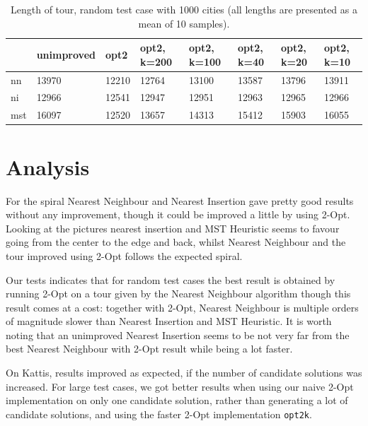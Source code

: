 \documentclass{report}
\begin{document}
\begin{table}
  \centering
  \begin{tabular}{|l|l|l|l|l|l|l|l|}
    \hline
   & unimproved      & opt2         & opt2, k=200  & opt2, k=100  & opt2, k=40   & opt2, k=20   & opt2, k=10  \\ \hline
nn & 13970 & 12210 & 12764 & 13100 & 13587 & 13796 & 13911 \\ \hline
ni & 12966 & 12541 & 12947 & 12951 & 12963 & 12965 & 12966 \\ \hline
mst & 16097 & 12520 & 13657 & 14313 & 15412 & 15903 & 16055 \\ \hline
  \end{tabular}
  \caption{Length of tour, random test case with 1000 cities (all lengths are presented as a mean of 10 samples).}
  \label{t1000}
\end{table}

\section{Analysis}
For the spiral Nearest Neighbour and Nearest Insertion gave pretty good results without any improvement, though it could be improved a little by using 2-Opt. Looking at the pictures nearest insertion and MST Heuristic seems to favour going from the center to the edge and back, whilst Nearest Neighbour and the tour improved using 2-Opt follows the expected spiral.

Our tests indicates that for random test cases the best result is obtained by running 2-Opt on a tour given by the Nearest Neighbour algorithm though this result comes at a cost: together with 2-Opt, Nearest Neighbour is multiple orders of magnitude slower than Nearest Insertion and MST Heuristic. It is worth noting that an unimproved Nearest Insertion seems to be not very far from the best Nearest Neighbour with 2-Opt result while being a lot faster.

On Kattis, results improved as expected, if the number of candidate solutions was increased. For large test cases, we got better results when using our naive 2-Opt implementation on only one candidate solution, rather than generating a lot of candidate solutions, and using the faster 2-Opt implementation \verb!opt2k!. 



\end{document}
